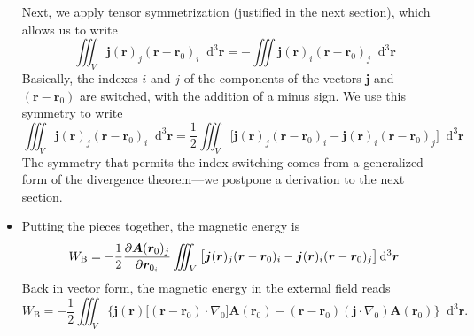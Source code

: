 \documentclass[11pt, a4paper]{article}
\newcommand{\diff}{\mathop{}\!\mathrm{d}} %
\newcommand{\dr}{\diff^{3} \r}  %
\renewcommand{\vec}[1]{\bm{#1}} %
\renewcommand{\r}{\vec{r}}
\newcommand{\A}{\vec{A}} %
\renewcommand{\j}{\vec{j}}  %
\renewcommand{\grad}{\nabla}
\begin{document}
\begin{itemize}
	
	Next, we apply tensor symmetrization (justified in the next section), which allows us to write
	\begin{equation*}
		\iiint_{V}\j(\r)_{j} (\r - \r_{0})_{i} \dr = - \iiint \j(\r)_{i}(\r - \r_{0})_{j}\dr
	\end{equation*}
    Basically, the indexes $ i $ and $ j $ of the components of the vectors $ \j $ and $ (\r - \r_{0}) $ are switched, with the addition of a minus sign. We use this symmetry to write
	\begin{equation*}
		\iiint_{V}\j(\r)_{j} (\r - \r_{0})_{i} \dr = \frac{1}{2}\iiint_{V}  \big[\j(\r)_{j} (\r - \r_{0})_{i} - \j(\r)_{i}(\r - \r_{0})_{j}\big]\dr
	\end{equation*}
    The symmetry that permits the index switching comes from a generalized form of the divergence theorem---we postpone a derivation to the next section.
	
	\item Putting the pieces together, the magnetic energy is
	\begin{equation*}
		W_{\text{B}} = -\frac{1}{2}\pdv{\A(\r_{0})_{j}}{\r_{0_{i}}} \iiint_{V}  \big[\j(\r)_{j} (\r - \r_{0})_{i} - \j(\r)_{i}(\r - \r_{0})_{j}\big]\dr
	\end{equation*}
	Back in vector form, the magnetic energy in the external field reads
	\begin{equation*}
		W_{\text{B}} = - \frac{1}{2}\iiint_{V} \Big\{\j(\r) \big[ (\r - \r_{0})\cdot \grad_{0} \big ] \A(\r_{0}) - (\r - \r_{0})(\j\cdot \grad_{0})\A(\r_{0}) \Big\} \dr.
	\end{equation*}
	

\end{itemize}
\end{document}
